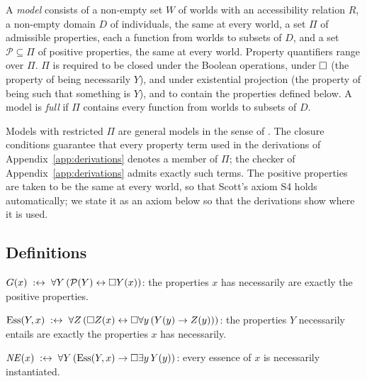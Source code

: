 \documentclass{situationist-preprint}
\newcommand{\Pos}{\mathcal{P}}
\newcommand{\NE}{\mathit{NE}}
\newcommand{\Ess}{\mathrm{Ess}}
\begin{document}
\begin{definition}\label{d:model}
A \emph{model} consists of a non-empty set $W$ of worlds with an accessibility relation $R$, a non-empty domain $D$ of individuals, the same at every world, a set $\Pi$ of admissible properties, each a function from worlds to subsets of $D$, and a set $\Pos \subseteq \Pi$ of positive properties, the same at every world. Property quantifiers range over $\Pi$. $\Pi$ is required to be closed under the Boolean operations, under $\mathord{\Box}$ (the property of being necessarily $Y$), and under existential projection (the property of being such that something is $Y$), and to contain the properties defined below. A model is \emph{full} if $\Pi$ contains every function from worlds to subsets of $D$.
\end{definition}

Models with restricted $\Pi$ are general models in the sense of \citet{Henkin1950}. The closure conditions guarantee that every property term used in the derivations of Appendix~\ref{app:derivations} denotes a member of $\Pi$; the checker of Appendix~\ref{app:derivations} admits exactly such terms. The positive properties are taken to be the same at every world, so that Scott's axiom S4 holds automatically; we state it as an axiom below so that the derivations show where it is used.

\subsection{Definitions}

\begin{definition}[Godlikeness]\label{d:godlike}
$G(x) \;:\leftrightarrow\; \forall Y\,(\Pos(Y) \leftrightarrow \nec Y(x))$: the properties $x$ has necessarily are exactly the positive properties.
\end{definition}

\begin{definition}[Essence]\label{d:essence}
$\Ess(Y,x) \;:\leftrightarrow\; \forall Z\,(\nec Z(x) \leftrightarrow \nec\forall y\,(Y(y) \to Z(y)))$: the properties $Y$ necessarily entails are exactly the properties $x$ has necessarily.
\end{definition}

\begin{definition}\label{d:ne}
$\NE(x) \;:\leftrightarrow\; \forall Y\,(\Ess(Y,x) \to \nec\exists y\,Y(y))$: every essence of $x$ is necessarily instantiated.
\end{definition}
\end{document}
